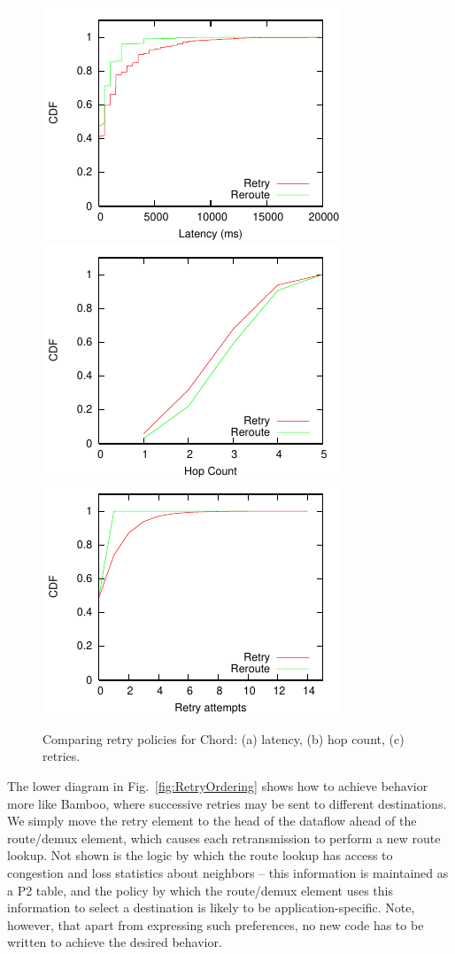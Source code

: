 \begin{figure}[ht]
\centerline{\includegraphics{figures/latencyCDF}
\includegraphics{figures/hopCDF}
\includegraphics{figures/retryCDF}}
\caption{Comparing retry policies for Chord: (a) latency, (b) hop
  count, (c) retries.}
\label{fig:retry}
\end{figure}

The lower diagram in Fig.~\ref{fig:RetryOrdering} shows how to
achieve behavior more like Bamboo, where successive retries may be
sent to different destinations. We simply move the retry element to
the head of the dataflow ahead of the route/demux element, which causes
each retransmission to perform a new route lookup.  Not shown is the
logic by which the route lookup has access to congestion and loss
statistics about neighbors -- this information is maintained as a P2
table, and the policy by which the route/demux element uses this
information to select a destination is likely to be
application-specific.  Note, however, that apart from expressing such 
preferences, no new code has to be written to achieve the desired behavior. 

